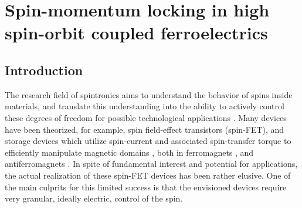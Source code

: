 \newcommand{\Unkr}{u_n(\bm{k}, \bm{r})}
\newcommand{\Eikr}{e^{i\bm{k}\cdot\bm{r}}}
\chapter{Spin-momentum locking in high spin-orbit coupled ferroelectrics \label{ch:Rashba}}
\section{Introduction}
%
The research field of spintronics aims to understand the behavior of spins inside materials, and translate this understanding into the ability to actively control these degrees of freedom for possible technological applications \cite{Joshi2016}.
Many devices have been theorized, for example, spin field-effect transistors (spin-FET)\cite{Datta1990}, and storage devices which utilize spin-current and associated spin-transfer torque to efficiently manipulate magnetic domains \cite{Kent2015}, both in ferromagnets \cite{Nunez2011}, and antiferromagnets \cite{Jungwirth2016}.
In spite of fundamental interest and potential for applications, the actual realization of these spin-FET devices has been rather elusive.
One of the main culprits for this limited success is that the envisioned devices require very granular, ideally electric, control of the spin.

